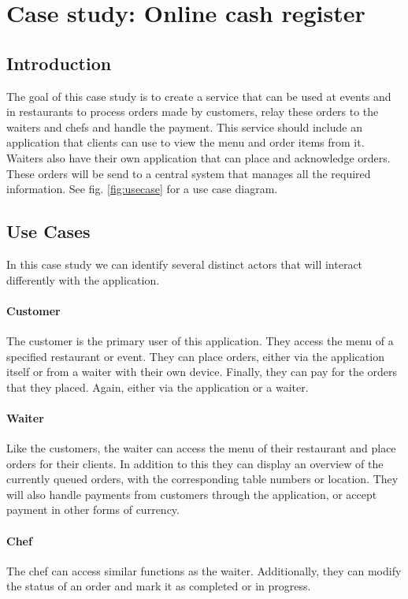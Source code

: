 \documentclass[12pt]{article}
\begin{document}
\section{Case study: Online cash register}\label{sec:casestudy}
\begin{multicols}{2}
\subsection{Introduction}
The goal of this case study is to create a service that can be used at events and in restaurants to process orders made by customers, relay these orders to the waiters and chefs and handle the payment. This service should include an application that clients can use to view the menu and order items from it. Waiters also have their own application that can place and acknowledge orders. These orders will be send to a central system that manages all the required information. See fig. \ref{fig:usecase} for a use case diagram.
\subsection{Use Cases}
In this case study we can identify several distinct actors that will interact differently with the application.
\paragraph{Customer}
The customer is the primary user of this application. They access the menu of a specified restaurant or event. They can place orders, either via the application itself or from a waiter with their own device. Finally, they can pay for the orders that they placed. Again, either via the application or a waiter.
\paragraph{Waiter}
Like the customers, the waiter can access the menu of their restaurant and place orders for their clients. In addition to this they can display an overview of the currently queued orders, with the corresponding table numbers or location. They will also handle payments from customers through the application, or accept payment in other forms of currency.
\paragraph{Chef}
The chef can access similar functions as the waiter. Additionally, they can modify the status of an order and mark it as completed or in progress.

\end{multicols}
\end{document}
